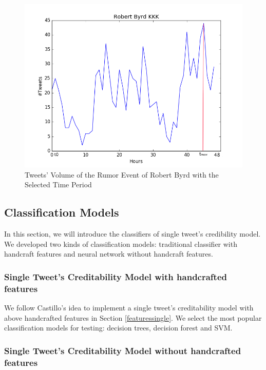 \begin{figure}[!h]
\centering
\includegraphics[width=0.7\columnwidth]{images/Robert_Byrd_KKK.png}
\caption{Tweets' Volume of the Rumor Event of Robert Byrd with the Selected Time Period}
\label{fig:KKK_part}
\end{figure}
\newpage
\subsection{Classification Models} %
In this section, we will introduce the classifiers of single tweet's credibility model. We developed two kinds of classification models: traditional classifier with handcraft features and neural network without handcraft features.
\subsubsection{Single Tweet's Creditability Model with handcrafted features} %
We follow Castillo's \cite{gupta2014tweetcred} idea to implement a single tweet's creditability model with above handcrafted features in Section \ref{featuressingle}. We select the most popular classification models for testing: decision trees, decision forest and SVM.  

  \subsubsection{Single Tweet's Creditability Model without handcrafted features} 
\label{sec:single_nofeature}


